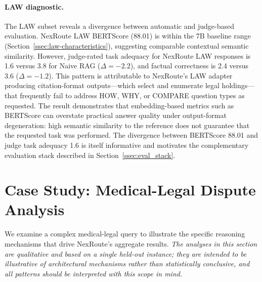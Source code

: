 \documentclass[a4paper,fleql,doubleblind]{cas-sc}
\begin{document}
\paragraph{LAW diagnostic.}
The LAW subset reveals a divergence between automatic and judge-based evaluation.
NexRoute LAW BERTScore (88.01) is within the 7B baseline range
(Section~\ref{ssec:law-characteristics}), suggesting comparable contextual
semantic similarity.
However, judge-rated task adequacy for NexRoute LAW responses is 1.6 versus
3.8 for Naive RAG ($\Delta{=}{-}2.2$), and factual correctness is 2.4 versus
3.6 ($\Delta{=}{-}1.2$).
This pattern is attributable to NexRoute's LAW adapter producing
citation-format outputs---which select and enumerate legal holdings---that
frequently fail to address HOW, WHY, or COMPARE question types as requested.
The result demonstrates that embedding-based metrics such as BERTScore can
overstate practical answer quality under output-format degeneration:
high semantic similarity to the reference does not guarantee that the
requested task was performed.
The divergence between BERTScore 88.01 and judge task adequacy 1.6 is itself
informative and motivates the complementary evaluation stack described in
Section~\ref{ssec:eval_stack}.

\section{Case Study: Medical-Legal Dispute Analysis}
\label{sec:casestudy}
We examine a complex medical-legal query to illustrate the specific reasoning mechanisms that drive NexRoute's aggregate results. \emph{The analyses in this section are qualitative and based on a single held-out instance; they are intended to be illustrative of architectural mechanisms rather than statistically conclusive, and all patterns should be interpreted with this scope in mind.}

\end{document}
